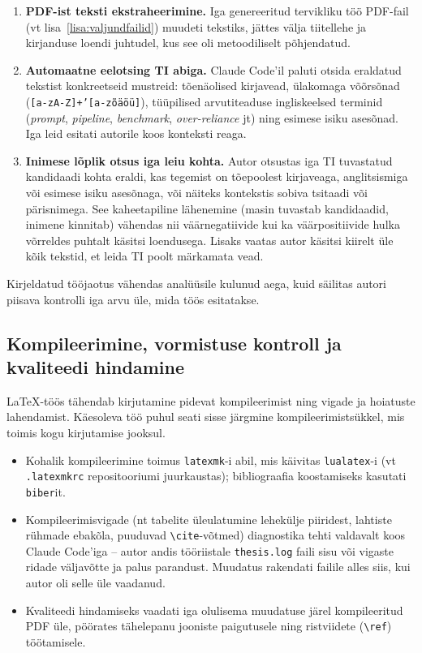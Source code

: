\begin{enumerate}
    \item \textbf{PDF-ist teksti ekstraheerimine.} Iga genereeritud tervikliku töö PDF-fail (vt lisa~\ref{lisa:valjundfailid}) muudeti tekstiks, jättes välja tiitellehe ja kirjanduse loendi juhtudel, kus see oli metoodiliselt põhjendatud.
    \item \textbf{Automaatne eelotsing TI abiga.} Claude Code'il paluti otsida eraldatud tekstist konkreetseid mustreid: tõenäolised kirjavead, ülakomaga võõrsõnad (\texttt{[a-zA-Z]+'[a-zõäöü]}), tüüpilised arvutiteaduse ingliskeelsed terminid (\textit{prompt}, \textit{pipeline}, \textit{benchmark}, \textit{over-reliance} jt) ning esimese isiku asesõnad. Iga leid esitati autorile koos konteksti reaga.
    \item \textbf{Inimese lõplik otsus iga leiu kohta.} Autor otsustas iga TI tuvastatud kandidaadi kohta eraldi, kas tegemist on tõepoolest kirjaveaga, anglitsismiga või esimese isiku asesõnaga, või näiteks kontekstis sobiva tsitaadi või pärisnimega. See kaheetapiline lähenemine (masin tuvastab kandidaadid, inimene kinnitab) vähendas nii väärnegatiivide kui ka väärpositiivide hulka võrreldes puhtalt käsitsi loendusega. Lisaks vaatas autor käsitsi kiirelt üle kõik tekstid, et leida TI poolt märkamata vead.
\end{enumerate}

Kirjeldatud tööjaotus vähendas analüüsile kulunud aega, kuid säilitas autori piisava kontrolli iga arvu üle, mida töös esitatakse.

\subsection{Kompileerimine, vormistuse kontroll ja kvaliteedi hindamine} \label{subsec:kompileerimine}

\LaTeX{}-töös tähendab kirjutamine pidevat kompileerimist ning vigade ja hoiatuste lahendamist. Käesoleva töö puhul seati sisse järgmine kompileerimistsükkel, mis toimis kogu kirjutamise jooksul.

\begin{itemize}
    \item Kohalik kompileerimine toimus \texttt{latexmk}-i abil, mis käivitas \texttt{lualatex}-i (vt \texttt{.latexmkrc} repositooriumi juurkaustas); bibliograafia koostamiseks kasutati \texttt{biber}it.
    \item Kompileerimisvigade (nt tabelite üleulatumine lehekülje piiridest, lahtiste rühmade ebakõla, puuduvad \texttt{\textbackslash cite}-võtmed) diagnostika tehti valdavalt koos Claude Code'iga -- autor andis tööriistale \texttt{thesis.log} faili sisu või vigaste ridade väljavõtte ja palus parandust. Muudatus rakendati failile alles siis, kui autor oli selle üle vaadanud.
    \item Kvaliteedi hindamiseks vaadati iga olulisema muudatuse järel kompileeritud PDF üle, pöörates tähelepanu jooniste paigutusele ning ristviidete (\texttt{\textbackslash ref}) töötamisele.
\end{itemize}

